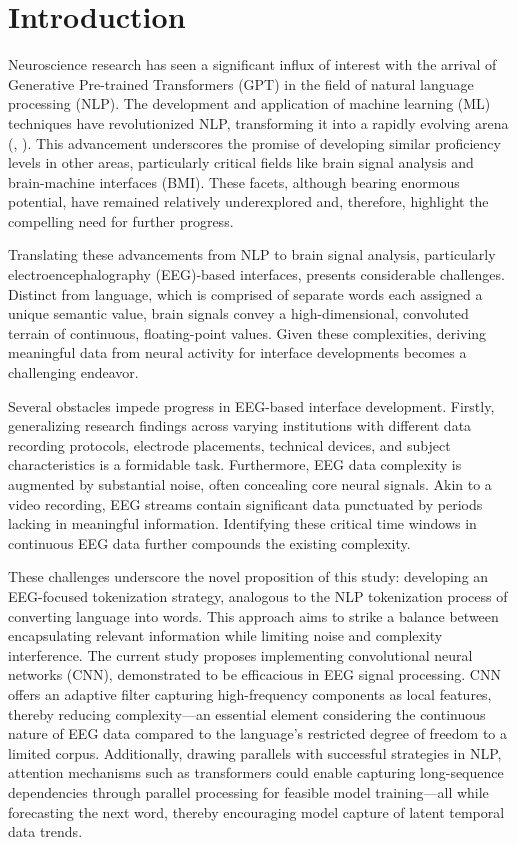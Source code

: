 \section{Introduction}
Neuroscience research has seen a significant influx of interest with the arrival of Generative Pre-trained Transformers (GPT) in the field of natural language processing (NLP). The development and application of machine learning (ML) techniques have revolutionized NLP, transforming it into a rapidly evolving arena (\cite{NIPS2017_3f5ee243}, \cite{radford_language_nodate}). This advancement underscores the promise of developing similar proficiency levels in other areas, particularly critical fields like brain signal analysis and brain-machine interfaces (BMI). These facets, although bearing enormous potential, have remained relatively underexplored and, therefore, highlight the compelling need for further progress.

Translating these advancements from NLP to brain signal analysis, particularly electroencephalography (EEG)-based interfaces, presents considerable challenges. Distinct from language, which is comprised of separate words each assigned a unique semantic value, brain signals convey a high-dimensional, convoluted terrain of continuous, floating-point values. Given these complexities, deriving meaningful data from neural activity for interface developments becomes a challenging endeavor.

Several obstacles impede progress in EEG-based interface development. Firstly, generalizing research findings across varying institutions with different data recording protocols, electrode placements, technical devices, and subject characteristics is a formidable task. Furthermore, EEG data complexity is augmented by substantial noise, often concealing core neural signals. Akin to a video recording, EEG streams contain significant data punctuated by periods lacking in meaningful information. Identifying these critical time windows in continuous EEG data further compounds the existing complexity.

These challenges underscore the novel proposition of this study: developing an EEG-focused tokenization strategy, analogous to the NLP tokenization process of converting language into words. This approach aims to strike a balance between encapsulating relevant information while limiting noise and complexity interference.
The current study proposes implementing convolutional neural networks (CNN), demonstrated to be efficacious in EEG signal processing. CNN offers an adaptive filter capturing high-frequency components as local features, thereby reducing complexity—an essential element considering the continuous nature of EEG data compared to the language’s restricted degree of freedom to a limited corpus. Additionally, drawing parallels with successful strategies in NLP, attention mechanisms such as transformers could enable capturing long-sequence dependencies through parallel processing for feasible model training—all while forecasting the next word, thereby encouraging model capture of latent temporal data trends.

